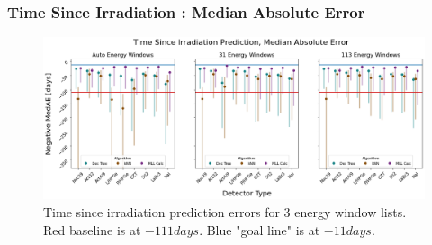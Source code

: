 \begin{frame}
  \frametitle{Time Since Irradiation : Median Absolute Error}
  \begin{adjustwidth}{-25pt}{0pt}
  \begin{figure}
    \centering
    \includegraphics[width=1.15\textwidth]{./figures/detector_preds_wrt_enlist_med_cooling_median_err.png}
    \captionsetup{margin=0.6cm}
    \caption{Time since irradiation prediction errors for 3 energy window lists. 
             Red baseline is at $-111 days$. Blue "goal line" is at $-11 days$.}
  \end{figure}
  \end{adjustwidth}
\end{frame}

